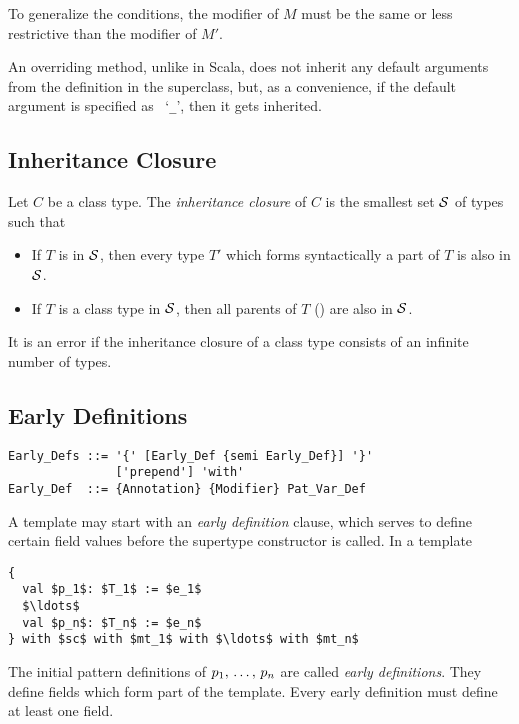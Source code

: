 To generalize the conditions, the modifier of $M$ must be the same or less restrictive than the modifier of $M'$. 

An overriding method, unlike in Scala, does not inherit any default arguments from the definition in the superclass, but, as a convenience, if the default argument is specified as ~`\lstinline!_!', then it gets inherited. 





\subsection{Inheritance Closure}
\label{sec:inheritance-closure}

\newcommand{\inheritclosure}{{\cal S}}

Let $C$ be a class type. The {\em inheritance closure} of $C$ is the smallest set $\inheritclosure$ of types such that
\begin{itemize}
\item If $T$ is in $\inheritclosure$, then every type $T'$ which forms syntactically a part of $T$ is also in $\inheritclosure$. 
\item If $T$ is a class type in $\inheritclosure$, then all parents of $T$ () are also in $\inheritclosure$. 
\end{itemize}
It is an error if the inheritance closure of a class type consists of an infinite number of types. 






\subsection{Early Definitions}
\label{sec:early-defs}

\syntax\begin{lstlisting}
Early_Defs ::= '{' [Early_Def {semi Early_Def}] '}' 
               ['prepend'] 'with'
Early_Def  ::= {Annotation} {Modifier} Pat_Var_Def
\end{lstlisting}

A template may start with an {\em early definition} clause, which serves to define certain field values before the supertype constructor is called. In a template
\begin{lstlisting}
{
  val $p_1$: $T_1$ := $e_1$
  $\ldots$
  val $p_n$: $T_n$ := $e_n$
} with $sc$ with $mt_1$ with $\ldots$ with $mt_n$
\end{lstlisting}
The initial pattern definitions of $p_1 ,\, \ldots ,\, p_n$ are called {\em early definitions}. They define fields which form part of the template. Every early definition must define at least one field. 

